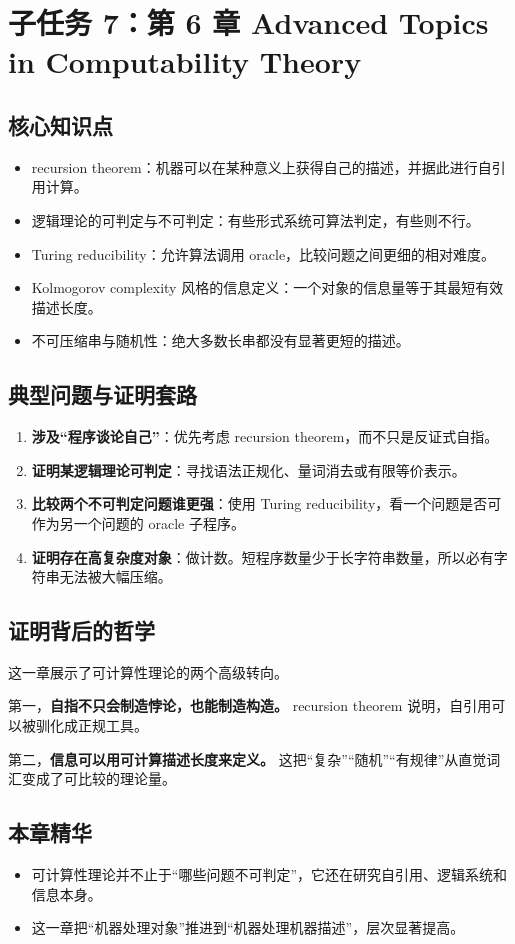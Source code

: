 \section{子任务 7：第 6 章 Advanced Topics in Computability Theory}

\subsection{核心知识点}

\begin{itemize}[leftmargin=2em]
  \item recursion theorem：机器可以在某种意义上获得自己的描述，并据此进行自引用计算。
  \item 逻辑理论的可判定与不可判定：有些形式系统可算法判定，有些则不行。
  \item Turing reducibility：允许算法调用 oracle，比较问题之间更细的相对难度。
  \item Kolmogorov complexity 风格的信息定义：一个对象的信息量等于其最短有效描述长度。
  \item 不可压缩串与随机性：绝大多数长串都没有显著更短的描述。
\end{itemize}

\subsection{典型问题与证明套路}

\begin{enumerate}[leftmargin=2em]
  \item \textbf{涉及“程序谈论自己”}：优先考虑 recursion theorem，而不只是反证式自指。
  \item \textbf{证明某逻辑理论可判定}：寻找语法正规化、量词消去或有限等价表示。
  \item \textbf{比较两个不可判定问题谁更强}：使用 Turing reducibility，看一个问题是否可作为另一个问题的 oracle 子程序。
  \item \textbf{证明存在高复杂度对象}：做计数。短程序数量少于长字符串数量，所以必有字符串无法被大幅压缩。
\end{enumerate}

\subsection{证明背后的哲学}

这一章展示了可计算性理论的两个高级转向。

第一，\textbf{自指不只会制造悖论，也能制造构造。} recursion theorem 说明，自引用可以被驯化成正规工具。

第二，\textbf{信息可以用可计算描述长度来定义。} 这把“复杂”“随机”“有规律”从直觉词汇变成了可比较的理论量。

\subsection{本章精华}

\begin{itemize}[leftmargin=2em]
  \item 可计算性理论并不止于“哪些问题不可判定”，它还在研究自引用、逻辑系统和信息本身。
  \item 这一章把“机器处理对象”推进到“机器处理机器描述”，层次显著提高。
\end{itemize}

\newpage
